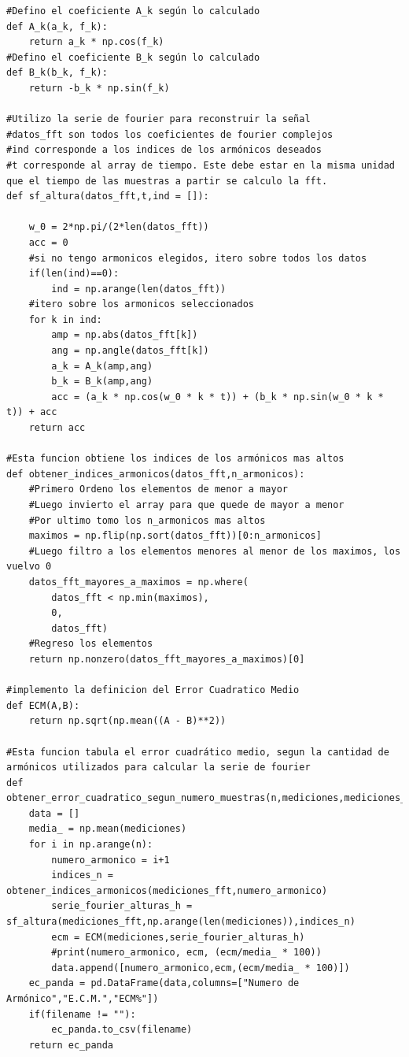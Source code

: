\documentclass[10pt,a4paper]{article}
\numberwithin{equation}{section}
\numberwithin{figure}{section}
\numberwithin{table}{section}
\begin{document}
\begin{verbatim}
#Defino el coeficiente A_k según lo calculado
def A_k(a_k, f_k):
    return a_k * np.cos(f_k)
#Defino el coeficiente B_k según lo calculado
def B_k(b_k, f_k):
    return -b_k * np.sin(f_k)

#Utilizo la serie de fourier para reconstruir la señal
#datos_fft son todos los coeficientes de fourier complejos
#ind corresponde a los indices de los armónicos deseados
#t corresponde al array de tiempo. Este debe estar en la misma unidad que el tiempo de las muestras a partir se calculo la fft.
def sf_altura(datos_fft,t,ind = []):

    w_0 = 2*np.pi/(2*len(datos_fft))
    acc = 0
    #si no tengo armonicos elegidos, itero sobre todos los datos
    if(len(ind)==0):
        ind = np.arange(len(datos_fft))
    #itero sobre los armonicos seleccionados
    for k in ind:
        amp = np.abs(datos_fft[k])
        ang = np.angle(datos_fft[k])
        a_k = A_k(amp,ang)
        b_k = B_k(amp,ang)
        acc = (a_k * np.cos(w_0 * k * t)) + (b_k * np.sin(w_0 * k * t)) + acc
    return acc

#Esta funcion obtiene los indices de los armónicos mas altos
def obtener_indices_armonicos(datos_fft,n_armonicos):
    #Primero Ordeno los elementos de menor a mayor
    #Luego invierto el array para que quede de mayor a menor
    #Por ultimo tomo los n_armonicos mas altos
    maximos = np.flip(np.sort(datos_fft))[0:n_armonicos]
    #Luego filtro a los elementos menores al menor de los maximos, los vuelvo 0
    datos_fft_mayores_a_maximos = np.where(
        datos_fft < np.min(maximos),
        0,
        datos_fft)
    #Regreso los elementos 
    return np.nonzero(datos_fft_mayores_a_maximos)[0]

#implemento la definicion del Error Cuadratico Medio
def ECM(A,B):
    return np.sqrt(np.mean((A - B)**2))

#Esta funcion tabula el error cuadrático medio, segun la cantidad de armónicos utilizados para calcular la serie de fourier
def obtener_error_cuadratico_segun_numero_muestras(n,mediciones,mediciones_fft,filename=""):
    data = []
    media_ = np.mean(mediciones)
    for i in np.arange(n):
        numero_armonico = i+1
        indices_n = obtener_indices_armonicos(mediciones_fft,numero_armonico)
        serie_fourier_alturas_h = sf_altura(mediciones_fft,np.arange(len(mediciones)),indices_n)
        ecm = ECM(mediciones,serie_fourier_alturas_h)
        #print(numero_armonico, ecm, (ecm/media_ * 100))
        data.append([numero_armonico,ecm,(ecm/media_ * 100)])
    ec_panda = pd.DataFrame(data,columns=["Numero de Armónico","E.C.M.","ECM%"])
    if(filename != ""):
        ec_panda.to_csv(filename)
    return ec_panda



\end{verbatim}
\end{document}
